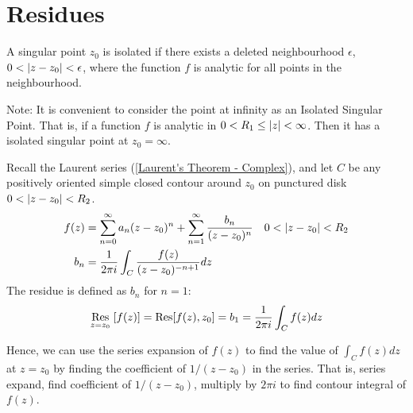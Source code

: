 \documentclass[12pt, english]{book}
\begin{document}
	\section{Residues} \label{Residues Section - Complex}
	
	\begin{definition}
		\label{Isolated Singular Points Definition - Complex}
		A singular point \(z_0\) is isolated if there exists a deleted neighbourhood \(\epsilon\), \(0 < \abs{z-z_0}< \epsilon\), where the function \(f\) is analytic for all points in the neighbourhood.
	\end{definition}

	Note: It is convenient to consider the point at infinity as an Isolated Singular Point. That is, if a function \(f\) is analytic in \(0<R_1 \leq \abs{z} < \infty\). Then it has a isolated singular point at \(z_0 = \infty\).
	
	\begin{definition}[Residue]
		Recall the Laurent series (\cref{Laurent's Theorem - Complex}), and let \(C\) be any positively oriented simple closed contour around \(z_0\) on punctured disk \(0 < \abs{z-z_0}< R_2\).  
		\begin{align*}
			f(z) &= \sum_{n=0}^{\infty} a_n (z-z_0)^n + \sum_{n=1}^{\infty} \frac{b_n}{(z-z_0)^n}
				& 0 < \abs{z-z_0} < R_2\\
			b_n &= \frac{1}{2\pi i} \int_{C} \frac{f(z)}{(z-z_0)^{-n+1}} dz
		\end{align*}
		The residue is defined as \(b_n\) for \(n=1\):
		\begin{align*}
			\underset{z=z_0}{\Res}[f(z)]
			= \Res[f(z), z_0] = b_1 = \frac{1}{2\pi i} \int_{C} f(z) dz
		\end{align*}
	\end{definition}
	
	Hence, we can use the series expansion of \(f(z)\) to find the value of \(\int_{C} f(z) dz\) at \(z=z_0\) by finding the coefficient of \(1/(z-z_0)\) in the series. That is, series expand, find coefficient of \(1/(z-z_0)\), multiply by \(2\pi i\) to find contour integral of \(f(z)\).
	
\end{document}
